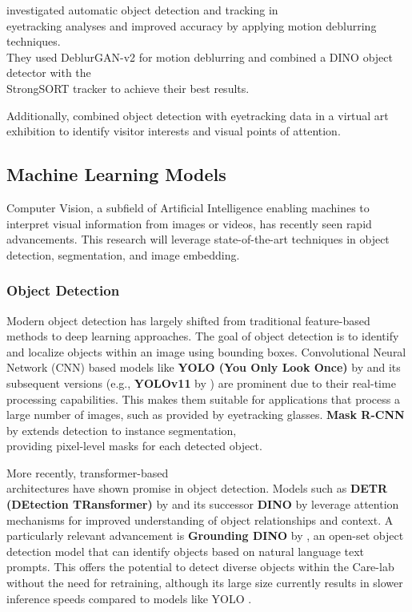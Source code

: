 \documentclass[english]{hogent-article}
\begin{document}
\textcite{Cederin2023} investigated automatic object detection and tracking in\\ eyetracking analyses and improved accuracy by applying motion deblurring techniques.\\ 
They used DeblurGAN-v2 for motion deblurring and combined a DINO object detector with the\\ StrongSORT tracker to achieve their best results.

Additionally, \textcite{Kulyk2023} combined object detection with eyetracking data in a virtual art exhibition to identify visitor interests and visual points of attention.

\subsection{Machine Learning Models}

Computer Vision, a subfield of Artificial Intelligence enabling machines to interpret visual information from images or videos, has recently seen rapid advancements. 
This research will leverage state-of-the-art techniques in object detection, segmentation, and image embedding.

\subsubsection{Object Detection}

Modern object detection has largely shifted from traditional feature-based methods to deep learning approaches.
The goal of object detection is to identify and localize objects within an image using bounding boxes.
Convolutional Neural Network (CNN) based models like \textbf{YOLO (You Only Look Once)} by \textcite{Redmon2016} and 
its subsequent versions (e.g., \textbf{YOLOv11} by \textcite{Khanam2024}) are prominent due to their real-time processing capabilities.
This makes them suitable for applications that process a large number of images, such as provided by eyetracking glasses.
\textbf{Mask R-CNN} by \textcite{He2018} extends detection to instance segmentation,\\ providing pixel-level masks for each detected object.

More recently, transformer-based\\ architectures have shown promise in object detection. 
Models such as \textbf{DETR (DEtection TRansformer)} by \textcite{Carion2020} and its successor \textbf{DINO} by \textcite{Zhang2022} 
leverage attention mechanisms for improved understanding of object relationships and context.
A particularly relevant advancement is \textbf{Grounding DINO} by \textcite{Liu2023}, an open-set object detection model that can identify objects based on natural language text prompts.
This offers the potential to detect diverse objects within the Care-lab without the need for retraining, although its large size currently results in slower inference speeds compared to models like YOLO \autocite{Son2024}.
\end{document}
